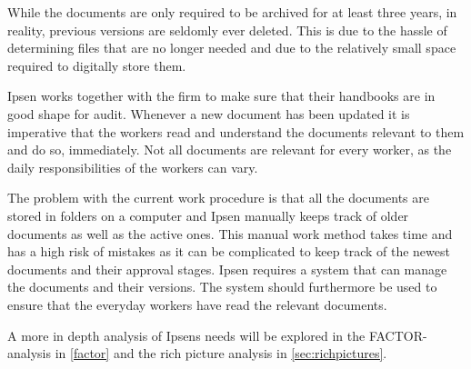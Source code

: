 While the documents are only required to be archived for at least three years, in reality, previous versions are seldomly ever deleted.
This is due to the hassle of determining files that are no longer needed and due to the relatively small space required to digitally store them.

Ipsen works together with the firm to make sure that their handbooks are in good shape for audit.
Whenever a new document has been updated it is imperative that the workers read and understand the documents relevant to them and do so, immediately.
Not all documents are relevant for every worker, as the daily responsibilities of the workers can vary.

The problem with the current work procedure is that all the documents are stored in folders on a computer and Ipsen manually keeps track of older documents as well as the active ones.
This manual work method takes time and has a high risk of mistakes as it can be complicated to keep track of the newest documents and their approval stages.
Ipsen requires a system that can manage the documents and their versions.
The system should furthermore be used to ensure that the everyday workers have read the relevant documents.

A more in depth analysis of Ipsens needs will be explored in the FACTOR-analysis in \cref{factor} and the rich picture analysis in \cref{sec:richpictures}.
